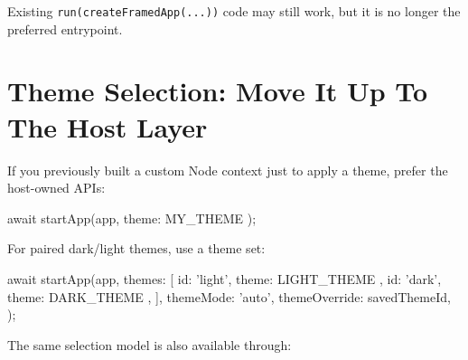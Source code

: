 Existing \texttt{r\allowbreak{}u\allowbreak{}n\allowbreak{}(\allowbreak{}c\allowbreak{}r\allowbreak{}e\allowbreak{}a\allowbreak{}t\allowbreak{}e\allowbreak{}F\allowbreak{}r\allowbreak{}a\allowbreak{}m\allowbreak{}e\allowbreak{}d\allowbreak{}A\allowbreak{}p\allowbreak{}p\allowbreak{}(\allowbreak{}.\allowbreak{}.\allowbreak{}.\allowbreak{})\allowbreak{})} code may still work, but it is no longer the preferred entrypoint.

\section{Theme Selection: Move It Up To The Host Layer}\label{record-269-theme-selection-move-it-up-to-the-host-layer}

If you previously built a custom Node context just to apply a theme, prefer the host-owned APIs:

\begin{CodeBlock}
await startApp(app, { theme: MY_THEME });
\end{CodeBlock}

For paired dark/light themes, use a theme set:

\begin{CodeBlock}
await startApp(app, {
  themes: [
    { id: 'light', theme: LIGHT_THEME },
    { id: 'dark', theme: DARK_THEME },
  ],
  themeMode: 'auto',
  themeOverride: savedThemeId,
});
\end{CodeBlock}

The same selection model is also available through:

